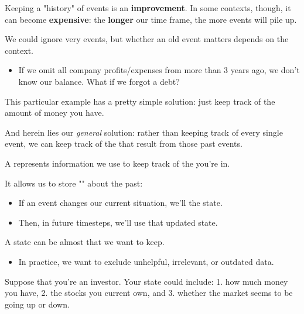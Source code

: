         Keeping a "history" of events is an \textbf{improvement}. In some contexts, though, it can become \textbf{expensive}: the \textbf{longer} our time frame, the more events will pile up.

        We could ignore very  events, but whether an old event matters depends on the context.

        \begin{itemize}
            \item \miniex If we omit all company profits/expenses from more than 3 years ago, we don't know our balance. What if we forgot a debt?
        \end{itemize}

        This particular example has a pretty simple solution: just keep track of the  amount of money you have.

        And herein lies our \textit{general} solution: rather than keeping track of every single event, we can keep track of the  that result from those past events.\\

        \begin{definition}
            A  represents information we use to keep track of the  you're in.
            
            It allows us to store "" about the past:

            \begin{itemize}
                \item If an event changes our current situation, we'll  the state.
                \item Then, in future timesteps, we'll use that updated state.
            \end{itemize}

            \subsecdiv
            
            A state can be almost  that we want to keep.

            \begin{itemize}
                \item In practice, we want to exclude unhelpful, irrelevant, or outdated data.
            \end{itemize}
        \end{definition}

        \miniex Suppose that you're an investor. Your state could include: 1. how much money you have, 2. the stocks you current own, and 3. whether the market seems to be going up or down.


